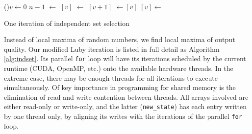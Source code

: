 \begin{algorithm}
 \LinesNumbered
 \For(){$v \gets 0$ \KwTo $n-1$}{
   \If{\OldState$[v] \neq$\Unknown}{
     \Return\;
   }
   \Begin $\gets$ \Xadj $[v]$\;
   \End $\gets$ \Xadj $[v + 1]$\;
   \Vqual$\gets$\Quality$[v]$\;
   \NewState$[v] \gets$\In\;
 }
 \caption{One iteration of independent set selection}
 \label{alg:indset}
\end{algorithm}

Instead of local maxima of random numbers, we find local maxima of
output quality.
Our modified Luby iteration is listed in full detail
as Algorithm \ref{alg:indset}.
Its parallel \texttt{for} loop will have its iterations scheduled by the
current runtime (CUDA, OpenMP, etc.) onto the available hardware threads.
In the extreme case, there may be enough threads for all iterations
to execute simultaneously.
Of key importance in programming for shared memory is
the elimination of read and write contention between threads.
All arrays involved are either read-only or write-only,
and the latter (\texttt{new\_state}) has each entry written by one
thread only, by aligning its writes with the iterations
of the parallel \texttt{for} loop.

